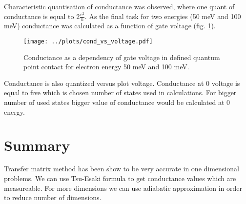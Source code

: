 \documentclass[12pt, a4paper]{article}
\begin{document}
Characteristic quantisation of conductance was observed, where one quant of conductance is equal to $2\frac{e^2}{h}$.
As the final task for two energies (50 meV and 100 meV) conductance was calculated as a function of gate voltage (fig. \ref{fig:cond_volt}).

\begin{figure}[ht]
    \begin{center}
        \texttt{[image: ../plots/cond\_vs\_voltage.pdf]}
    \end{center}
    \caption{Conductance as a dependency of gate voltage in defined quantum point contact for electron energy 50 meV and 100 meV.}
    \label{fig:cond_volt}
\end{figure}

Conductance is also quantized versus plot voltage.
Conductance at 0 voltage is equal to five which is chosen number of states used in calculations.
For bigger number of used states bigger value of conductance would be calculated at 0 energy.

\section*{Summary}

Transfer matrix method has been show to be very accurate in one dimensional problems.
We can use Tsu-Esaki formula to get conductance values which are measureable.
For more dimensions we can use adiabatic approximation in order to reduce number of dimensions.
\end{document}
